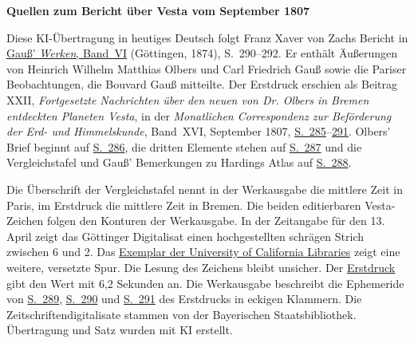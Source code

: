 \clearpage\thispagestyle{empty}
\begin{center}\textbf{Quellen zum Bericht über Vesta vom September 1807}\end{center}
\noindent Diese KI-Übertragung in heutiges Deutsch folgt Franz Xaver von Zachs Bericht in \href{https://gdz.sub.uni-goettingen.de/id/PPN236007467}{Gauß’ \textit{Werken}, Band~VI} (Göttingen, 1874), S.~290--292. Er enthält Äußerungen von Heinrich Wilhelm Matthias Olbers und Carl Friedrich Gauß sowie die Pariser Beobachtungen, die Bouvard Gauß mitteilte. Der Erstdruck erschien als Beitrag XXII, \textit{Fortgesetzte Nachrichten über den neuen von Dr. Olbers in Bremen entdeckten Planeten Vesta}, in der \textit{Monatlichen Correspondenz zur Beförderung der Erd- und Himmelskunde}, Band~XVI, September 1807, \href{https://www.digitale-sammlungen.de/en/view/bsb10538607?page=299}{S.~285}--\href{https://www.digitale-sammlungen.de/en/view/bsb10538607?page=305}{291}. Olbers’ Brief beginnt auf \href{https://www.digitale-sammlungen.de/en/view/bsb10538607?page=300}{S.~286}, die dritten Elemente stehen auf \href{https://www.digitale-sammlungen.de/en/view/bsb10538607?page=301}{S.~287} und die Vergleichstafel und Gauß’ Bemerkungen zu Hardings Atlas auf \href{https://www.digitale-sammlungen.de/en/view/bsb10538607?page=302}{S.~288}.
\par\medskip
Die Überschrift der Vergleichstafel nennt in der Werkausgabe die mittlere Zeit in Paris, im Erstdruck die mittlere Zeit in Bremen. Die beiden editierbaren Vesta-Zeichen folgen den Konturen der Werkausgabe. In der Zeitangabe für den 13. April zeigt das Göttinger Digitalisat einen hochgestellten schrägen Strich zwischen 6 und 2. Das \href{https://archive.org/details/werkecarlf06gausrich}{Exemplar der University of California Libraries} zeigt eine weitere, versetzte Spur. Die Lesung des Zeichens bleibt unsicher. Der \href{https://www.digitale-sammlungen.de/en/view/bsb10538607?page=302}{Erstdruck} gibt den Wert mit 6,2 Sekunden an. Die Werkausgabe beschreibt die Ephemeride von \href{https://www.digitale-sammlungen.de/en/view/bsb10538607?page=303}{S.~289}, \href{https://www.digitale-sammlungen.de/en/view/bsb10538607?page=304}{S.~290} und \href{https://www.digitale-sammlungen.de/en/view/bsb10538607?page=305}{S.~291} des Erstdrucks in eckigen Klammern. Die Zeitschriftendigitalisate stammen von der Bayerischen Staatsbibliothek. Übertragung und Satz wurden mit KI erstellt.
\clearpage
